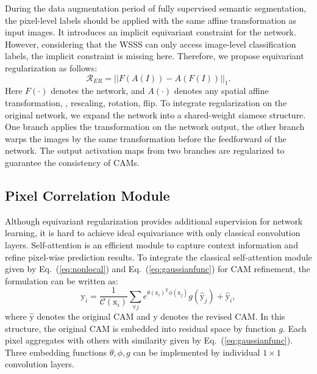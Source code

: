 \documentclass[10pt,twocolumn,letterpaper]{article}
\begin{document}
	During the data augmentation period of fully supervised semantic segmentation, the pixel-level labels should be applied with the same affine transformation as input images. It introduces an implicit equivariant constraint for the network. However, considering that the WSSS can only access image-level classification labels, the implicit constraint is missing here. Therefore, we propose equivariant regularization as follows:
	\begin{equation}
	\label{eq:er}
	\mathcal{R}_{ER}=||F(A(I))-A(F(I))||_1.
	\end{equation}
	Here $F(\cdot)$ denotes the network, and $A(\cdot)$ denotes any spatial affine transformation, \eg, rescaling, rotation, flip. To integrate regularization on the original network, we expand the network into a shared-weight siamese structure. One branch applies the transformation on the network output, the other branch warps the images by the same transformation before the feedforward of the network. The output activation maps from two branches are regularized to guarantee the consistency of CAMs.
	
	\subsection{Pixel Correlation Module}
	\label{subsec:PCM}
	Although equivariant regularization provides additional supervision for network learning, it is hard to achieve ideal equivariance with only classical convolution layers. Self-attention is an efficient module to capture context information and refine pixel-wise prediction results. To integrate the classical self-attention module given by Eq.~(\ref{eq:nonlocal}) and Eq.~(\ref{eq:gaussianfunc}) for CAM refinement, the formulation can be written as:
	\begin{equation}
	\label{eq:clsselfattention}
	\mathrm{y}_i=\frac{1}{\mathcal{C}(\mathrm{x}_i)}\sum_{\forall j}e^{\theta(\mathrm{x}_i)^\mathrm{T}\phi(\mathrm{x}_j)}g(\mathrm{\hat{y}}_j)+\mathrm{\hat{y}}_i,
	\end{equation}
	where $\mathrm{\hat{y}}$ denotes the original CAM and $\mathrm{y}$ denotes the revised CAM. In this structure, the original CAM is embedded into residual space by function $g$. Each pixel aggregates with others with similarity given by Eq.~(\ref{eq:gaussianfunc}). Three embedding functions $\theta, \phi, g$ can be implemented by individual $1\times 1$ convolution layers.
	
\end{document}

